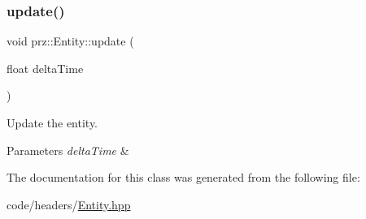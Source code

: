 \subsubsection{\texorpdfstring{update()}{update()}}
{\footnotesize\ttfamily void prz\+::\+Entity\+::update (\begin{DoxyParamCaption}\item[{float}]{delta\+Time }\end{DoxyParamCaption})\hspace{0.3cm}{\ttfamily [inline]}}



Update the entity. 


\begin{DoxyParams}{Parameters}
{\em delta\+Time} & \\
\hline
\end{DoxyParams}


The documentation for this class was generated from the following file\+:\begin{DoxyCompactItemize}
\item 
code/headers/\mbox{\hyperlink{_entity_8hpp}{Entity.\+hpp}}\end{DoxyCompactItemize}
